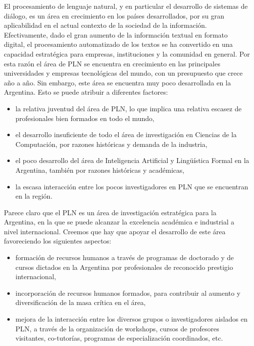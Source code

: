 
El procesamiento de lenguaje natural, y en particular el
desarrollo de sistemas de di\'alogo, es un \'area en crecimiento
en los pa\'ises desarrollados, por su gran aplicabilidad en el
actual contexto de la sociedad de la informaci\'on. Efectivamente,
dado el gran aumento de la informaci\'on textual en formato
digital, el procesamiento automatizado de los textos se ha
convertido en una capacidad estrat\'egica para empresas,
instituciones y la comunidad en general. Por esta raz\'on
el \'area de PLN se encuentra en crecimiento en las principales
universidades y empresas tecnol\'ogicas del mundo, con un
presupuesto que crece a\~no a a\~no. Sin embargo, 
este \'area se encuentra muy poco desarrollada en la Argentina. Esto se puede
atribuir a diferentes factores:

\begin{itemize}
\item la relativa juventud del \'area de PLN, lo que implica una relativa escasez de profesionales bien formados en todo el mundo,
\item el desarrollo insuficiente de todo el \'area de investigaci\'on en Ciencias de la Computaci\'on, por razones hist\'oricas y demanda de la industria,
\item el poco desarrollo del \'area de Inteligencia Artificial y
Ling\"u\'istica Formal en la Argentina, tambi\'en por razones hist\'oricas
y acad\'emicas,
\item la escasa interacci\'on entre los pocos investigadores en PLN que se encuentran en la regi\'on.
\end{itemize}

Parece claro que el PLN es un \'area de investigaci\'on estrat\'egica
para la Argentina, en la que se puede alcanzar la excelencia acad\'emica
e industrial a nivel internacional. Creemos que hay que apoyar el
desarrollo de este \'area favoreciendo los siguientes aspectos:

\begin{itemize}
\item formaci\'on de recursos humanos a trav\'es
de programas de doctorado y de cursos dictados en la Argentina por profesionales de
reconocido prestigio internacional,

\item incorporaci\'on de recursos humanos formados, para contribuir
al aumento y diversificaci\'on de la masa cr\'itica en el \'area,

\item mejora de la interacci\'on entre los diversos grupos o investigadores aislados en PLN, a
trav\'es de la organizaci\'on de workshops, cursos de profesores visitantes, co-tutor\'ias,
programas de especializaci\'on coordinados, etc.
\end{itemize}

